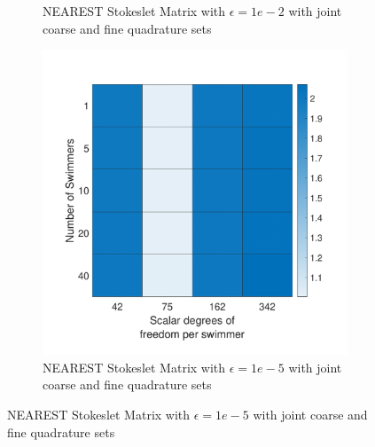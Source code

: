 \begin{figure}
\begin{subfigure}{0.3\textwidth}
        \caption{NEAREST Stokeslet Matrix with $\epsilon=1e-2$ with joint coarse and fine quadrature sets}
    \end{subfigure}
    \begin{subfigure}{0.3\textwidth}
        \includegraphics[width=\linewidth]{Images/Condition/Stokeslet Matrix using Contained NEAREST-5.pdf}
        \caption{NEAREST Stokeslet Matrix with $\epsilon=1e-5$ with joint coarse and fine quadrature sets}
    \end{subfigure}
\end{figure}

